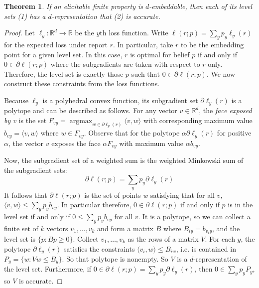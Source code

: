 \documentclass[12pt]{article}
\newtheorem{theorem}{Theorem}
\theoremstyle{definition}
\DeclareMathOperator*{\argmax}{\textrm{argmax}}
\newcommand{\reals}{\mathbb{R}}
\begin{document}
\begin{theorem}
  If an elicitable finite property is $d$-embeddable, then each of its level sets (1) has a $d$-representation that (2) is accurate.
\end{theorem}
\begin{proof}
  Let $\ell_y: \reals^d \to \reals$ be the $y$th loss function.
  Write $\ell(r;p) = \sum_y p_y \ell_y(r)$ for the expected loss under report $r$.
  In particular, take $r$ to be the embedding point for a given level set.
  In this case, $r$ is optimal for belief $p$ if and only if $0 \in \partial \ell(r;p)$ where the subgradients are taken with respect to $r$ only.
  Therefore, the level set is exactly those $p$ such that $0 \in \partial \ell(r;p)$.
  We now construct these constraints from the loss functions.

  Because $\ell_y$ is a polyhedral convex function, its subgradient set $\partial \ell_y(r)$ is a polytope and can be described as follows.
  For any vector $v \in \reals^d$, the \emph{face exposed by $v$} is the set $F_{vy} = \argmax_{w \in \partial \ell_y(r)} \langle v, w \rangle$ with corresponding maximum value $b_{vy} = \langle v, w \rangle$ where $w \in F_{vy}$.
  Observe that for the polytope $\alpha \partial \ell_y(r)$ for positive $\alpha$, the vector $v$ exposes the face $\alpha F_{vy}$ with maximum value $\alpha b_{vy}$.

  Now, the subgradient set of a weighted sum is the weighted Minkowski sum of the subgradient sets:
    \[ \partial \ell(r;p) = \sum_y p_y \partial \ell_y(r) \]
  It follows that $\partial \ell(r;p)$ is the set of points $w$ satisfying that for all $v$, $\langle v,w \rangle \leq \sum_y p_y b_{vy}$.
  In particular therefore, $0 \in \partial \ell(r;p)$ if and only if $p$ is in the level set if and only if $0 \leq \sum_y p_y b_{vy}$ for all $v$.
  It is a polytope, so we can collect a finite set of $k$ vectors $v_1,\dots,v_k$ and form a matrix $B$ where $B_{iy} = b_{v_iy}$, and the level set is $\{p : B p \geq 0 \}$.
  Collect $v_1,\dots,v_k$ as the rows of a matrix $V$.
  For each $y$, the polytope $\partial \ell_y(r)$ satisfies the constraints $\langle v_i,w\rangle \leq B_{iw}$, i.e. is contained in $P_y = \{ w : Vw \leq B_y\}$.
  So that polytope is nonempty.
  So $V$ is a $d$-representation of the level set.
  Furthermore, if $0 \in \partial \ell(r;p) = \sum_y p_y \partial \ell_y(r)$, then $0 \in \sum_y p_y P_y$, so $V$ is accurate.
\end{proof}
\end{document}
